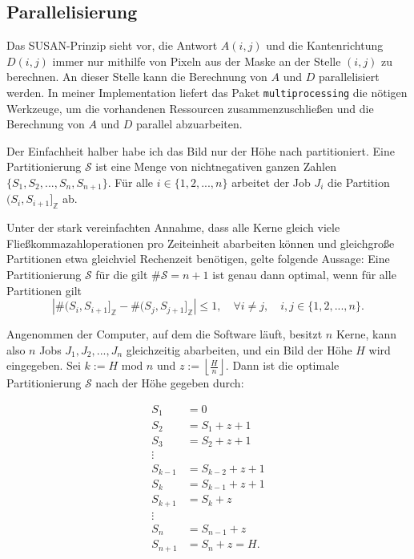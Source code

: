 \documentclass[a4paper, 11pt]{report}
\theoremstyle{definition}
\begin{document}
			\subsection{Parallelisierung}
				Das SUSAN-Prinzip sieht vor, die Antwort $A(i,j)$ und die Kantenrichtung $D(i,j)$ immer nur mithilfe von Pixeln aus der Maske an der Stelle $(i,j)$ zu berechnen. An dieser Stelle kann die Berechnung von $A$ und $D$ parallelisiert werden. In meiner Implementation liefert das Paket \texttt{multiprocessing} die nötigen Werkzeuge, um die vorhandenen Ressourcen zusammenzuschließen und die Berechnung von $A$ und $D$ parallel abzuarbeiten.

				Der Einfachheit halber habe ich das Bild nur der Höhe nach partitioniert. Eine Partitionierung $\mathcal{S}$ ist eine Menge von nichtnegativen ganzen Zahlen $\{S_1, S_2, ..., S_n, S_{n+1}\}$. Für alle $i \in \{1,2,...,n\}$ arbeitet der Job $J_i$ die Partition $(S_i, S_{i+1}]_\mathbb{Z}$ ab.

				Unter der stark vereinfachten Annahme, dass alle Kerne gleich viele Fließkommazahloperationen pro Zeiteinheit abarbeiten können und gleichgroße Partitionen etwa gleichviel Rechenzeit benötigen, gelte folgende Aussage: Eine Partitionierung $\mathcal{S}$ für die gilt $\#\mathcal{S} = n+1$ ist genau dann optimal, wenn für alle Partitionen gilt
				$$|\#(S_i, S_{i+1}]_\mathbb{Z} - \#(S_j, S_{j+1}]_\mathbb{Z}| \leq 1, \quad \forall i \neq j, \quad i,j \in \{1,2,...,n\}.$$

				Angenommen der Computer, auf dem die Software läuft, besitzt $n$ Kerne, kann also $n$ Jobs $J_1,J_2,...,J_n$ gleichzeitig abarbeiten, und ein Bild der Höhe $H$ wird eingegeben. Sei $k := H \text{ mod } n$ und $z := \left\lfloor \frac{H}{n} \right\rfloor$. Dann ist die optimale Partitionierung $\mathcal{S}$ nach der Höhe gegeben durch:

				\begin{align*}
				S_1 	&= 					0		\\
				S_2 	&= S_1		+	z + 1		\\
				S_3 	&= S_2 		+ 	z + 1		\\
									\vdots			\\
				S_{k-1} &= S_{k-2}	+ 	z + 1		\\
				S_{k}	&= S_{k-1} 	+ 	z + 1		\\
				S_{k+1} &= S_k 		+ 	z			\\
									\vdots			\\
				S_{n} 	&= S_{n-1} 	+ 	z 			\\
				S_{n+1} &= S_{n}	+	z  = H.	\\
				\end{align*}
\end{document}
